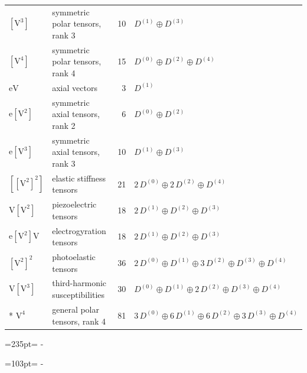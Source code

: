 \documentclass[10pt,a4paper]{article}
\newcommand{\needspace}[1]{\par\penalty-100\begingroup\dimen0=#1\relax\dimen2=\pagegoal
  \advance\dimen2-\pagetotal\ifdim\dimen0>\dimen2\relax\ifdim\dimen2>0pt\vfil\break\fi\fi
  \endgroup}
\numberwithin{equation}{section}
\newcommand{\irrJ}[1]{D^{(#1)}}
\newcommand{\jahn}[1]{\mathrm{#1}}
\newlength{\fillwidth}\newlength{\cellwidth}\newlength{\colwidth}
\begin{document}
{\begin{longtable}{@{}llr>{\RaggedRight\arraybackslash}p{\fillwidth}@{}}
$\jahn{[V^{3}]}$ & symmetric polar tensors, rank 3 & 10 & $\irrJ{1} \oplus\allowbreak \irrJ{3}$\\
$\jahn{[V^{4}]}$ & symmetric polar tensors, rank 4 & 15 & $\irrJ{0} \oplus\allowbreak \irrJ{2} \oplus\allowbreak \irrJ{4}$\\
$\jahn{eV}$ & axial vectors & 3 & $\irrJ{1}$\\
$\jahn{e[V^{2}]}$ & symmetric axial tensors, rank 2 & 6 & $\irrJ{0} \oplus\allowbreak \irrJ{2}$\\
$\jahn{e[V^{3}]}$ & symmetric axial tensors, rank 3 & 10 & $\irrJ{1} \oplus\allowbreak \irrJ{3}$\\
$\jahn{[[V^{2}]^{2}]}$ & elastic stiffness tensors & 21 & $2\,\irrJ{0} \oplus\allowbreak 2\,\irrJ{2} \oplus\allowbreak \irrJ{4}$\\
$\jahn{V[V^{2}]}$ & piezoelectric tensors & 18 & $2\,\irrJ{1} \oplus\allowbreak \irrJ{2} \oplus\allowbreak \irrJ{3}$\\
$\jahn{e[V^{2}]V}$ & electrogyration tensors & 18 & $2\,\irrJ{1} \oplus\allowbreak \irrJ{2} \oplus\allowbreak \irrJ{3}$\\
$\jahn{[V^{2}]^{2}}$ & photoelastic tensors & 36 & $2\,\irrJ{0} \oplus\allowbreak \irrJ{1} \oplus\allowbreak 3\,\irrJ{2} \oplus\allowbreak \irrJ{3} \oplus\allowbreak \irrJ{4}$\\
$\jahn{V[V^{3}]}$ & third-harmonic susceptibilities & 30 & $\irrJ{0} \oplus\allowbreak \irrJ{1} \oplus\allowbreak 2\,\irrJ{2} \oplus\allowbreak \irrJ{3} \oplus\allowbreak \irrJ{4}$\\*
$\jahn{V^{4}}$ & general polar tensors, rank 4 & 81 & $3\,\irrJ{0} \oplus\allowbreak 6\,\irrJ{1} \oplus\allowbreak 6\,\irrJ{2} \oplus\allowbreak 3\,\irrJ{3} \oplus\allowbreak \irrJ{4}$\\
\bottomrule\end{longtable}}
\needspace{235pt}
\needspace{103pt}
\end{document}
